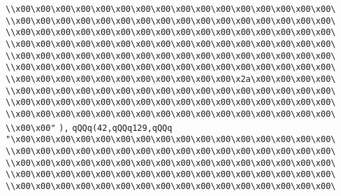 \verb|\\x00\x00\x00\x00\x00\x00\x00\x00\x00\x00\x00\x00\x00\x00\x00\x00\|\newline
\verb|\\x00\x00\x00\x00\x00\x00\x00\x00\x00\x00\x00\x00\x00\x00\x00\x00\|\newline
\verb|\\x00\x00\x00\x00\x00\x00\x00\x00\x00\x00\x00\x00\x00\x00\x00\x00\|\newline
\verb|\\x00\x00\x00\x00\x00\x00\x00\x00\x00\x00\x00\x00\x00\x00\x00\x00\|\newline
\verb|\\x00\x00\x00\x00\x00\x00\x00\x00\x00\x00\x00\x00\x00\x00\x00\x00\|\newline
\verb|\\x00\x00\x00\x00\x00\x00\x00\x00\x00\x00\x00\x00\x00\x00\x00\x00\|\newline
\verb|\\x00\x00\x00\x00\x00\x00\x00\x00\x00\x00\x00\x2a\x00\x00\x00\x00\|\newline
\verb|\\x00\x00\x00\x00\x00\x00\x00\x00\x00\x00\x00\x00\x00\x00\x00\x00\|\newline
\verb|\\x00\x00\x00\x00\x00\x00\x00\x00\x00\x00\x00\x00\x00\x00\x00\x00\|\newline
\verb|\\x00\x00\x00\x00\x00\x00\x00\x00\x00\x00\x00\x00\x00\x00\x00\x00\|\newline
\verb|\\x00\x00"|\newline
\verb|),|\newline
\verb|qQQq(42,qQQq129,qQQq|\newline
\verb|"\x00\x00\x00\x00\x00\x00\x00\x00\x00\x00\x00\x00\x00\x00\x00\x00\|\newline
\verb|\\x00\x00\x00\x00\x00\x00\x00\x00\x00\x00\x00\x00\x00\x00\x00\x00\|\newline
\verb|\\x00\x00\x00\x00\x00\x00\x00\x00\x00\x00\x00\x00\x00\x00\x00\x00\|\newline
\verb|\\x00\x00\x00\x00\x00\x00\x00\x00\x00\x00\x00\x00\x00\x00\x00\x00\|\newline
\verb|\\x00\x00\x00\x00\x00\x00\x00\x00\x00\x00\x00\x00\x00\x00\x00\x00\|\newline
